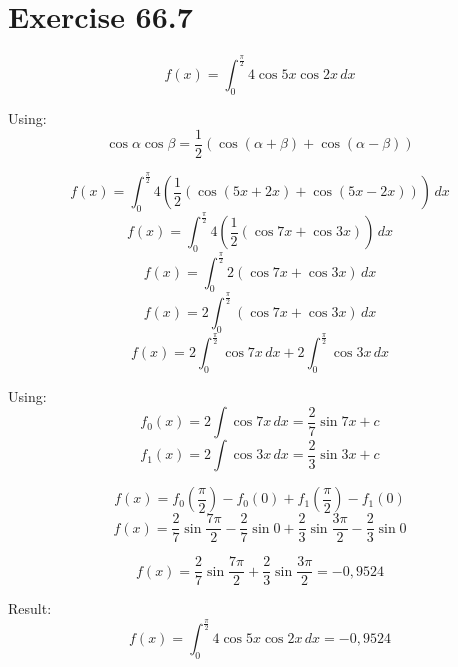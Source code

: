 \documentclass[a4paper, 10pt]{scrartcl}
\begin{document}
\section{Exercise 66.7}

\[f(x) = \int_{0}^{\frac{\pi}{2}}{4\cos{5x}\cos{2x}\,dx}\]

Using:
\[\cos{\alpha}\cos{\beta} = \frac{1}{2}(\cos{(\alpha + \beta)} + \cos{(\alpha - \beta)})\]

\[f(x) = \int_{0}^{\frac{\pi}{2}}{4\left(\frac{1}{2}(\cos{(5x + 2x)} + \cos{(5x - 2x)})\right)\,dx}\]
\[f(x) = \int_{0}^{\frac{\pi}{2}}{4\left(\frac{1}{2}(\cos{7x} + \cos{3x})\right)\,dx}\]
\[f(x) = \int_{0}^{\frac{\pi}{2}}{2(\cos{7x} + \cos{3x})\,dx}\]
\[f(x) = 2\int_{0}^{\frac{\pi}{2}}{(\cos{7x} + \cos{3x})\,dx}\]
\[f(x) = 2\int_{0}^{\frac{\pi}{2}}{\cos{7x}\,dx} +
         2\int_{0}^{\frac{\pi}{2}}{\cos{3x}\,dx}\]

Using:
\[f_0(x) = 2\int{\cos{7x}\,dx} = \frac{2}{7}\sin{7x} + c\]
\[f_1(x) = 2\int{\cos{3x}\,dx} = \frac{2}{3}\sin{3x} + c\]

\[f(x) = f_0(\frac{\pi}{2}) - f_0(0) + f_1(\frac{\pi}{2}) - f_1(0)\]
\[f(x) = \frac{2}{7}\sin{\frac{7\pi}{2}} - \frac{2}{7}\sin{0} +
         \frac{2}{3}\sin{\frac{3\pi}{2}} - \frac{2}{3}\sin{0}\]

\[f(x) = \frac{2}{7}\sin{\frac{7\pi}{2}} +
         \frac{2}{3}\sin{\frac{3\pi}{2}} = -0,9524\]

Result:
\[f(x) = \int_{0}^{\frac{\pi}{2}}{4\cos{5x}\cos{2x}\,dx} = -0,9524\]
\end{document}
